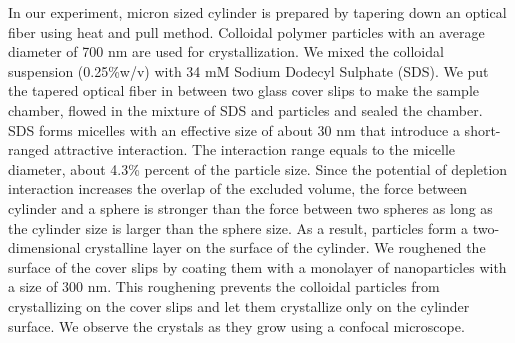\documentclass[12pt]{article}
\begin{document}
In our experiment, micron sized cylinder is prepared by tapering down an optical fiber using heat and pull method. Colloidal polymer particles with an average diameter of 700 nm are used for crystallization. We mixed the colloidal suspension (0.25\%w/v) with 34 mM Sodium Dodecyl Sulphate (SDS). We put the tapered optical fiber in between two glass cover slips to make the sample chamber, flowed in the mixture of SDS and particles and sealed the chamber. SDS forms micelles with an effective size of about 30 nm that introduce a short-ranged attractive interaction. The interaction range equals to the micelle diameter, about  4.3\% percent of the particle size. Since the potential of depletion interaction increases the overlap of the excluded volume, the force between cylinder and a sphere is stronger than the force between two spheres as long as the cylinder size is larger than the sphere size. As a result, particles form a two-dimensional crystalline layer on the surface of the cylinder. We roughened the surface of the cover slips by coating them with a monolayer of nanoparticles with a size of 300 nm. This roughening prevents the colloidal particles from crystallizing on the cover slips and let them crystallize only on the cylinder surface. We observe the crystals as they grow using a confocal microscope.
\end{document}
